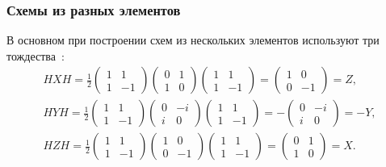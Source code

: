 \documentclass[pscyr,notitlepage]{hedwork}
\renewcommand{\~}[1]{\widetilde{#1}}
\begin{document}
  \subsubsection{Схемы из разных элементов}
  
  В основном при построении схем из нескольких элементов используют три
  тождества~\cite{main,task}:
  \begin{gather*}
    HXH = \frac{1}{2}
      \begin{pmatrix}
        1 & 1 \\[-1.7ex] 1 & -1
      \end{pmatrix}
      \begin{pmatrix}
        0 & 1 \\[-1.7ex] 1 & 0
      \end{pmatrix}
      \begin{pmatrix}
        1 & 1 \\[-1.7ex] 1 & -1
      \end{pmatrix} =
      \begin{pmatrix}
        1 & 0 \\[-1.7ex] 0 & -1
      \end{pmatrix} = Z, \\
    HYH = \frac{1}{2}
      \begin{pmatrix}
        1 & 1 \\[-1.7ex] 1 & -1
      \end{pmatrix}
      \begin{pmatrix}
        0 & -i \\[-1.7ex] i & 0
      \end{pmatrix}
      \begin{pmatrix}
        1 & 1 \\[-1.7ex] 1 & -1
      \end{pmatrix} =
      -\begin{pmatrix}
        0 & -i \\[-1.7ex] i & 0
      \end{pmatrix} = -Y, \\
    HZH = \frac{1}{2}
      \begin{pmatrix}
        1 & 1 \\[-1.7ex] 1 & -1
      \end{pmatrix}
      \begin{pmatrix}
        1 & 0 \\[-1.7ex] 0 & -1
      \end{pmatrix}
      \begin{pmatrix}
        1 & 1 \\[-1.7ex] 1 & -1
      \end{pmatrix} =
      \begin{pmatrix}
        0 & 1 \\[-1.7ex] 1 & 0
      \end{pmatrix} = X.
  \end{gather*}
  
\end{document}
